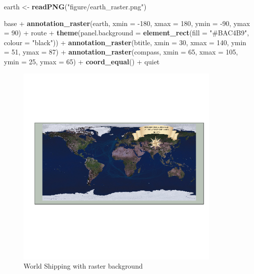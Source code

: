 \documentclass[]{article}
\newenvironment{Shaded}{}{}
\newcommand{\KeywordTok}[1]{\textcolor[rgb]{0.00,0.44,0.13}{\textbf{{#1}}}}
\newcommand{\DataTypeTok}[1]{\textcolor[rgb]{0.56,0.13,0.00}{{#1}}}
\newcommand{\DecValTok}[1]{\textcolor[rgb]{0.25,0.63,0.44}{{#1}}}
\newcommand{\StringTok}[1]{\textcolor[rgb]{0.25,0.44,0.63}{{#1}}}
\newcommand{\NormalTok}[1]{{#1}}
\let\Oldincludegraphics\includegraphics
\renewcommand{\includegraphics}[1]{\Oldincludegraphics[width=10cm]{#1}}
\begin{document}
\begin{Shaded}
\begin{Highlighting}[]
\NormalTok{earth <- }\KeywordTok{readPNG}\NormalTok{(}\StringTok{"figure/earth_raster.png"}\NormalTok{)}

\NormalTok{base + }\KeywordTok{annotation_raster}\NormalTok{(earth, }\DataTypeTok{xmin =} \NormalTok{-}\DecValTok{180}\NormalTok{, }\DataTypeTok{xmax =} \DecValTok{180}\NormalTok{, }\DataTypeTok{ymin =} \NormalTok{-}\DecValTok{90}\NormalTok{, }\DataTypeTok{ymax =} \DecValTok{90}\NormalTok{) + }
    \NormalTok{route + }\KeywordTok{theme}\NormalTok{(}\DataTypeTok{panel.background =} \KeywordTok{element_rect}\NormalTok{(}\DataTypeTok{fill =} \StringTok{"#BAC4B9"}\NormalTok{, }\DataTypeTok{colour =} \StringTok{"black"}\NormalTok{)) + }
    \KeywordTok{annotation_raster}\NormalTok{(btitle, }\DataTypeTok{xmin =} \DecValTok{30}\NormalTok{, }\DataTypeTok{xmax =} \DecValTok{140}\NormalTok{, }\DataTypeTok{ymin =} \DecValTok{51}\NormalTok{, }\DataTypeTok{ymax =} \DecValTok{87}\NormalTok{) + }
    \KeywordTok{annotation_raster}\NormalTok{(compass, }\DataTypeTok{xmin =} \DecValTok{65}\NormalTok{, }\DataTypeTok{xmax =} \DecValTok{105}\NormalTok{, }\DataTypeTok{ymin =} \DecValTok{25}\NormalTok{, }\DataTypeTok{ymax =} \DecValTok{65}\NormalTok{) + }
    \KeywordTok{coord_equal}\NormalTok{() + quiet}
\end{Highlighting}
\end{Shaded}
\begin{figure}[htbp]
\centering
\includegraphics{figure/World_Shipping_with_raster_background.png}
\caption{World Shipping with raster background}
\end{figure}
\end{document}
